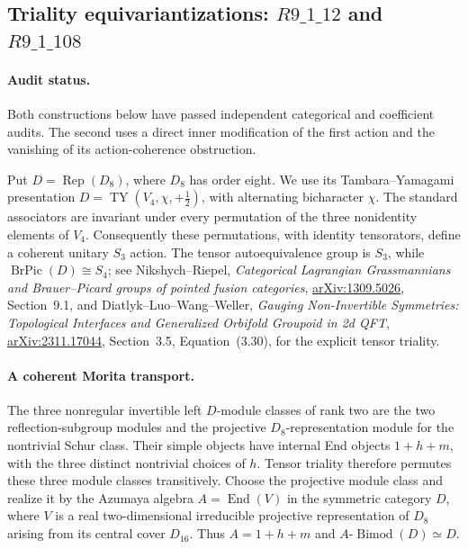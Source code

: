 \subsection[Triality equivariantizations]{Triality equivariantizations: $R9\_1\_12$ and $R9\_1\_108$}
\label{sec:triality-equivariant}

\paragraph{Audit status.}
Both constructions below have passed independent categorical and
coefficient audits. The second uses a direct inner modification of the
first action and the vanishing of its action-coherence obstruction.

Put $D=\operatorname{Rep}(D_8)$, where $D_8$ has order eight.  We use its
Tambara--Yamagami presentation
$D=\operatorname{TY}(V_4,\chi,+\tfrac12)$, with alternating bicharacter
$\chi$.  The standard associators are invariant under every permutation of
the three nonidentity elements of $V_4$.  Consequently these permutations,
with identity tensorators, define a coherent unitary $S_3$ action.
The tensor autoequivalence group is $S_3$, while
$\operatorname{BrPic}(D)\cong S_4$; see Nikshych--Riepel,
\emph{Categorical Lagrangian Grassmannians and Brauer--Picard groups of
pointed fusion categories}, \href{https://arxiv.org/abs/1309.5026}{arXiv:1309.5026},
Section~9.1, and Diatlyk--Luo--Wang--Weller,
\emph{Gauging Non-Invertible Symmetries: Topological Interfaces and
Generalized Orbifold Groupoid in 2d QFT},
\href{https://arxiv.org/abs/2311.17044}{arXiv:2311.17044}, Section~3.5,
Equation~(3.30), for the explicit tensor triality.

\paragraph{A coherent Morita transport.}
The three nonregular invertible left $D$-module classes of rank two are the
two reflection-subgroup modules and the projective $D_8$-representation
module for the nontrivial Schur class.  Their simple objects have internal
End objects $1+h+m$, with the three distinct nontrivial choices of $h$.
Tensor triality therefore permutes these three module classes transitively.
Choose the projective module class and realize it by the Azumaya algebra
$A=\operatorname{End}(V)$ in the symmetric category $D$, where $V$ is a real
two-dimensional irreducible projective representation of $D_8$ arising
from its central cover $D_{16}$.  Thus $A=1+h+m$ and
$A\text{-}\operatorname{Bimod}(D)\simeq D$.

